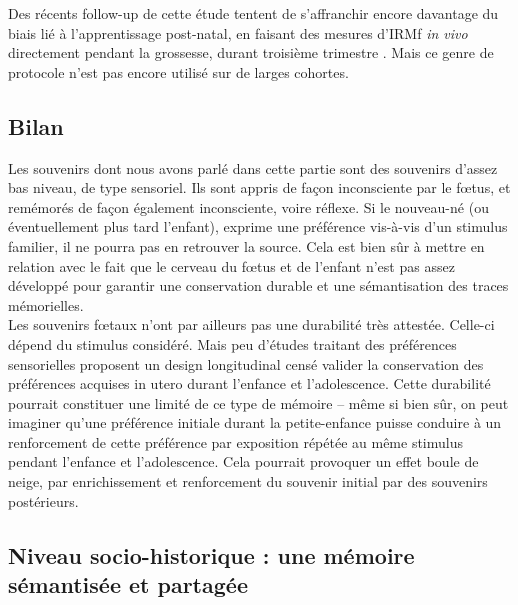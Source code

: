 \documentclass[french]{article}
\begin{document}
				Des récents follow-up de cette étude tentent de s'affranchir encore davantage du biais lié à l'apprentissage post-natal, en faisant des mesures d'IRMf \textit{in vivo} directement pendant la grossesse, durant troisième trimestre \cite{jardri2012}. Mais ce genre de protocole n'est pas encore utilisé sur de larges cohortes.
			\subsection{Bilan}
				Les souvenirs dont nous avons parlé dans cette partie sont des souvenirs d'assez bas niveau, de type sensoriel. Ils sont appris de façon inconsciente par le fœtus, et remémorés de façon également inconsciente, voire réflexe. Si le nouveau-né (ou éventuellement plus tard l'enfant), exprime une préférence vis-à-vis d'un stimulus familier, il ne pourra pas en retrouver la source. Cela est bien sûr à mettre en relation avec le fait que le cerveau du fœtus et de l'enfant n'est pas assez développé pour garantir une conservation durable et une sémantisation des traces mémorielles.\\
				Les souvenirs fœtaux n'ont par ailleurs pas une durabilité très attestée. Celle-ci dépend du stimulus considéré. Mais peu d'études traitant des préférences sensorielles proposent un design longitudinal censé valider la conservation des préférences acquises in utero durant l'enfance et l'adolescence. Cette durabilité pourrait constituer une limité de ce type de mémoire -- même si bien sûr, on peut imaginer qu'une préférence initiale durant la petite-enfance puisse conduire à un renforcement de cette préférence par exposition répétée au même stimulus pendant l'enfance et l'adolescence. Cela pourrait provoquer un effet boule de neige, par enrichissement et renforcement du souvenir initial par des souvenirs postérieurs.
				
		\subsection{Niveau socio-historique : une mémoire sémantisée et partagée}
		
\end{document}

